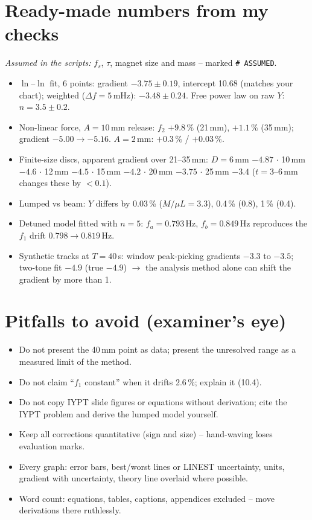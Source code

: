 \documentclass[11pt,a4paper]{article}
\newcommand{\Y}{Y}                                   %
\begin{document}
\section{Ready-made numbers from my checks}\label{sec:numbers}

\begin{notebox}
\emph{Assumed in the scripts:} $f_s$, $\tau$, magnet size and mass -- marked \texttt{\# ASSUMED}.
\begin{itemize}
\item $\ln$--$\ln$ fit, 6 points: gradient $-3.75\pm0.19$, intercept 10.68 (matches your
chart); weighted ($\Delta f=5$\,mHz): $-3.48\pm0.24$. Free power law on raw $\Y$:
$n=3.5\pm0.2$.
\item Non-linear force, $A=10$\,mm release: $f_2$ $+9.8\,\%$ (21\,mm), $+1.1\,\%$
(35\,mm); gradient $-5.00\to-5.16$. $A=2$\,mm: $+0.3\,\%$ / $+0.03\,\%$.
\item Finite-size discs, apparent gradient over 21--35\,mm: $D=6$\,mm $-4.87$ $\cdot$
10\,mm $-4.6$ $\cdot$ 12\,mm $-4.5$ $\cdot$ 15\,mm $-4.2$ $\cdot$ 20\,mm $-3.75$ $\cdot$
25\,mm $-3.4$ ($t=3$--6\,mm changes these by $<0.1$).
\item Lumped vs beam: $\Y$ differs by 0.03\,\% ($M/\mu L=3.3$), 0.4\,\% (0.8), 1\,\% (0.4).
\item Detuned model fitted with $n=5$: $f_a=0.793$\,Hz, $f_b=0.849$\,Hz reproduces the
$f_1$ drift $0.798\to0.819$\,Hz.
\item Synthetic tracks at $T=40$\,s: window peak-picking gradients $-3.3$ to $-3.5$;
two-tone fit $-4.9$ (true $-4.9$) $\to$ the analysis method alone can shift the gradient
by more than 1.
\end{itemize}
\end{notebox}

\section{Pitfalls to avoid (examiner's eye)}
\begin{itemize}
\item Do not present the 40\,mm point as data; present the unresolved range as a measured
limit of the method.
\item Do not claim ``$f_1$ constant'' when it drifts 2.6\,\%; explain it (10.4).
\item Do not copy IYPT slide figures or equations without derivation; cite the IYPT
problem and derive the lumped model yourself.
\item Keep all corrections quantitative (sign and size) -- hand-waving loses evaluation marks.
\item Every graph: error bars, best/worst lines or LINEST uncertainty, units, gradient with
uncertainty, theory line overlaid where possible.
\item Word count: equations, tables, captions, appendices excluded -- move derivations
there ruthlessly.
\end{itemize}
\end{document}
